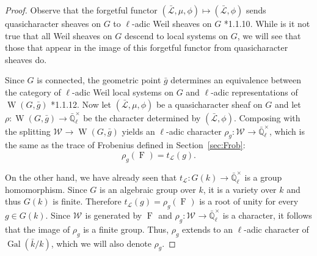 \documentclass[11pt]{amsart}
\theoremstyle{plain}
\theoremstyle{definition}
\theoremstyle{remark}
\newcommand{\EE}{\mathbb{\bar Q}_\ell}
\newcommand{\bFq}{\bar{k}}
\newcommand{\Fq}{k}
\newcommand{\EEx}{\EE^\times}
\DeclareMathOperator{\Gal}{Gal}
\DeclareMathOperator{\W}{W}
\newcommand{\Frob}[1]{\operatorname{F}_{#1}}
\newcommand{\qcs}[1]{{\mathcal{#1}}}
\newcommand{\gqcs}[1]{{\mathcal{\bar #1}}}
\newcommand{\Weil}[1]{\mathcal{W}_{#1}}
\newcommand{\trFrob}[1]{t_{#1}}
\newcommand{\bg}{\bar{g}}
\begin{document}
\begin{proof}
  Observe that the forgetful functor $(\gqcs{L},\mu,\phi) \mapsto (\gqcs{L},\phi)$
  sends quasicharacter sheaves on $G$ to $\ell$-adic Weil sheaves on $G$ \cite{deligne:80a}*{1.1.10}.
  While is it not true that all Weil sheaves on $G$ descend to local systems on $G$, 
  we will see that those that appear in the image of this forgetful functor from quasicharacter sheaves do. 

  Since $G$ is connected, the geometric point $\bg$ determines
  an equivalence between the category of $\ell$-adic Weil local systems on $G$ and
  $\ell$-adic representations of $\W(G,\bg)$ \cite{deligne:80a}*{1.1.12}.
  Now let $(\gqcs{L},\mu,\phi)$ be a quasicharacter sheaf on $G$ 
  and let $\rho : \W(G, \bg) \to \EEx$ be the character determined by $(\gqcs{L},\phi)$.
  Composing with the splitting $\Weil{} \to \W(G,\bg)$ yields an $\ell$-adic character
  $\rho_g : \Weil{} \to \EEx$, which is the same as the trace of Frobenius defined in Section~\ref{sec:Frob}:
  \[
  \rho_g(\Frob{}) =  \trFrob{\qcs{L}}(g).
  \]
  
  On the other hand, we have already seen that $\trFrob{\qcs{L}} : G(\Fq) \to \EEx$
  is a group homomorphism. Since $G$ is an algebraic group over $\Fq$, it is a
  variety over $\Fq$ and thus $G(\Fq)$ is finite.
  Therefore $\trFrob{\qcs{L}}(g) = \rho_g(\Frob{})$ is a root of unity
  for every $g\in G(\Fq)$.  Since $\Weil{}$ is generated by
  $\Frob{}$ and $\rho_g : \Weil{} \to \EEx$ is
  a character, it follows that the image of $\rho_g$ is a finite group.
  Thus, $\rho_g$ extends to an $\ell$-adic character of $\Gal(\bFq/\Fq)$, 
  which we will also denote $\rho_g$.


\end{proof}
\end{document}
